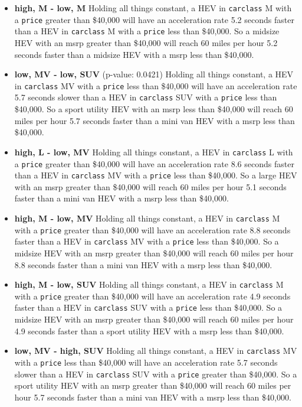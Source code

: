 \documentclass[acmsmall]{acmart}
\begin{document}
\begin{itemize}
\item[] \textbf{high, M - low, M} Holding all things constant, a HEV in \texttt{carclass} M with a \texttt{price} greater than \$40,000 will have an acceleration rate 5.2 seconds faster than a HEV in \texttt{carclass} M with a \texttt{price} less than \$40,000. So a midsize HEV with an msrp greater than \$40,000 will reach 60 miles per hour 5.2 seconds faster than a midsize HEV with a msrp less than \$40,000.
\item[] \textbf{low, MV - low, SUV} (p-value: 0.0421) Holding all things constant, a HEV in \texttt{carclass} MV with a \texttt{price} less than \$40,000 will have an acceleration rate 5.7 seconds slower than a HEV in \texttt{carclass} SUV with a \texttt{price} less than \$40,000. So a sport utility HEV with an msrp less than \$40,000 will reach 60 miles per hour 5.7 seconds faster than a mini van HEV with a msrp less than \$40,000.
\item[] \textbf{high, L - low, MV} Holding all things constant, a HEV in \texttt{carclass} L with a \texttt{price} greater than \$40,000 will have an acceleration rate 8.6 seconds faster than a HEV in \texttt{carclass} MV with a \texttt{price} less than \$40,000. So a large HEV with an msrp greater than \$40,000 will reach 60 miles per hour 5.1 seconds faster than a mini van HEV with a msrp less than \$40,000.
\item[] \textbf{high, M - low, MV} Holding all things constant, a HEV in \texttt{carclass} M with a \texttt{price} greater than \$40,000 will have an acceleration rate 8.8 seconds faster than a HEV in \texttt{carclass} MV with a \texttt{price} less than \$40,000. So a midsize HEV with an msrp greater than \$40,000 will reach 60 miles per hour 8.8 seconds faster than a mini van HEV with a msrp less than \$40,000.
\item[] \textbf{high, M - low, SUV} Holding all things constant, a HEV in \texttt{carclass} M with a \texttt{price} greater than \$40,000 will have an acceleration rate 4.9 seconds faster than a HEV in \texttt{carclass} SUV with a \texttt{price} less than \$40,000. So a midsize HEV with an msrp greater than \$40,000 will reach 60 miles per hour 4.9 seconds faster than a sport utility HEV with a msrp less than \$40,000.
\item[] \textbf{low, MV - high, SUV} Holding all things constant, a HEV in \texttt{carclass} MV with a \texttt{price} less than \$40,000 will have an acceleration rate 5.7 seconds slower than a HEV in \texttt{carclass} SUV with a \texttt{price} greater than \$40,000. So a sport utility HEV with an msrp greater than \$40,000 will reach 60 miles per hour 5.7 seconds faster than a mini van HEV with a msrp less than \$40,000.
\end{itemize}
\end{document}
